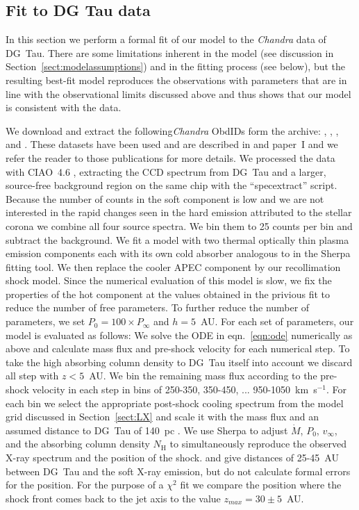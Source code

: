 \subsection{Fit to DG Tau data}
In this section we perform a formal fit of our model to the \emph{Chandra} data of DG~Tau. There are some limitations inherent in the model (see discussion in Section~\ref{sect:modelassumptions}) and in the fitting process (see below), but the resulting best-fit model reproduces the observations with parameters that are in line with the observational limits discussed above and thus shows that our model is consistent with the data.

We download and extract the following\emph{Chandra} ObdIDs form the archive: , , , and . These datasets have been used and are described in \citet{2008A&A...478..797G,2008A&A...488L..13S} and paper~I and we refer the reader to those publications for more details. We processed the data with CIAO~4.6 \citep{2006SPIE.6270E..60F}, extracting the CCD spectrum from DG~Tau and a larger, source-free background region on the same chip with the ``specextract'' script. Because the number of counts in the soft component is low and we are not interested in the rapid changes seen in the hard emission attributed to the stellar corona \citep{2008A&A...478..797G} we combine all four source spectra. We bin them to 25 counts per bin and subtract the background. We fit a model with two thermal optically thin plasma emission components \citep[APEC][]{2012ApJ...756..128F} each with its own cold absorber analogous to \citep{2008A&A...478..797G} in the Sherpa fitting tool. We then replace the cooler APEC component by our recollimation shock model. Since the numerical evaluation of this model is slow, we fix the properties of the hot component at the values obtained in the privious fit to reduce the number of free parameters. To further reduce the number of parameters, we set $P_0 = 100\times P_\infty$ and $h=5$~AU. For each set of parameters, our model is evaluated as follows: We solve the ODE in eqn.~\ref{eqn:ode} numerically as above and calculate mass flux and pre-shock velocity for each numerical step. To take the high absorbing column density to DG~Tau itself into account we discard all step with $z<5$~AU. We bin the remaining mass flux according to the pre-shock velocity in each step in bins of 250-350, 350-450, ... 950-1050~km~s$^{-1}$. For each bin we select the appropriate post-shock cooling spectrum from the model grid discussed in Section~\ref{sect:LX} and scale it with the mass flux and an assumed distance to DG~Tau of 140~pc \citep{1994AJ....108.1872K}. We use Sherpa to adjust $\dot M$, $P_0$, $v_\infty$, and the absorbing column density $N_\textrm{H}$ to simultaneously reproduce the observed X-ray spectrum and the position of the shock. \citet{2008A&A...488L..13S} and \citet{2011ASPC..448..617G} give distances of 25-45~AU between DG~Tau and the soft X-ray emission, but do not calculate formal errors for the position. For the purpose of a $\chi^2$ fit we compare the position where the shock front comes back to the jet axis to the value $z_{max} = 30\pm5$~AU.

